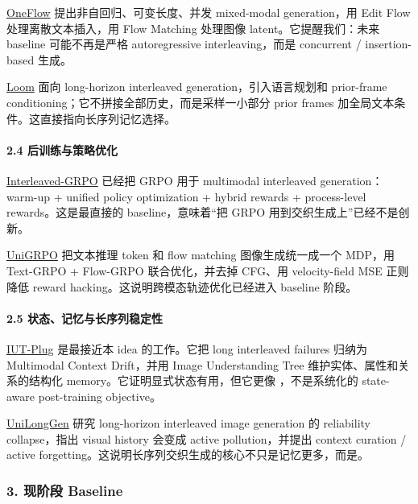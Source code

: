 \href{https://arxiv.org/abs/2510.03506}{OneFlow} 提出非自回归、可变长度、并发 mixed-modal generation，用 Edit Flow 处理离散文本插入，用 Flow Matching 处理图像 latent。它提醒我们：未来 baseline 可能不再是严格 autoregressive interleaving，而是 concurrent / insertion-based 生成。

\href{https://arxiv.org/abs/2512.18254}{Loom} 面向 long-horizon interleaved generation，引入语言规划和 prior-frame conditioning；它不拼接全部历史，而是采样一小部分 prior frames 加全局文本条件。这直接指向长序列记忆选择。

\paragraph{2.4 后训练与策略优化}

\href{https://arxiv.org/abs/2603.09538}{Interleaved-GRPO} 已经把 GRPO 用于 multimodal interleaved generation：warm-up + unified policy optimization + hybrid rewards + process-level rewards。这是最直接的 baseline，意味着“把 GRPO 用到交织生成上”已经不是创新。

\href{https://arxiv.org/abs/2603.23500}{UniGRPO} 把文本推理 token 和 flow matching 图像生成统一成一个 MDP，用 Text-GRPO + Flow-GRPO 联合优化，并去掉 CFG、用 velocity-field MSE 正则降低 reward hacking。这说明跨模态轨迹优化已经进入 baseline 阶段。

\paragraph{2.5 状态、记忆与长序列稳定性}

\href{https://arxiv.org/abs/2510.10969}{IUT-Plug} 是最接近本 idea 的工作。它把 long interleaved failures 归纳为 Multimodal Context Drift，并用 Image Understanding Tree 维护实体、属性和关系的结构化 memory。它证明显式状态有用，但它更像 ，不是系统化的 state-aware post-training objective。

\href{https://arxiv.org/abs/2603.07540}{UniLongGen} 研究 long-horizon interleaved image generation 的 reliability collapse，指出 visual history 会变成 active pollution，并提出 context curation / active forgetting。这说明长序列交织生成的核心不只是记忆更多，而是。

\subsubsection*{3. 现阶段 Baseline}

